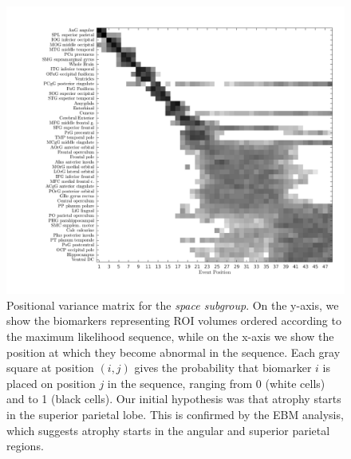 \begin{figure}[H]
 \centering
 \includegraphics[scale=0.4, trim=100 50 0 0]{images/ebm/mriAllGaussUnifDirSPA/posVarianceMatrix.png}
 \caption{Positional variance matrix for the \emph{space subgroup}. On the y-axis, we show the biomarkers representing ROI volumes ordered according to the maximum likelihood sequence, while on the x-axis we show the position at which they become abnormal in the sequence. Each gray square at position $(i,j)$ gives the probability that biomarker $i$ is placed on position $j$ in the sequence, ranging from 0 (white cells) and to 1 (black cells). Our initial hypothesis was that atrophy starts in the superior parietal lobe. This is confirmed by the EBM analysis, which suggests atrophy starts in the angular and superior parietal regions.}
   \label{fig:SPA}
\end{figure}

\newcommand*{\snapLocationSPA}{images/ebm/mriAllGaussUnifDirSPA/snapshots} 
\newcommand*{\captionSnapEBMSPA}{\caption{(a) Timing of atrophy for the \emph{space} subgroup. White regions have not been affected, while red regions have been affected by the corresponding stage.}\label{fig:SnapEBMSPA}}



